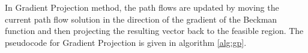 In Gradient Projection method, the path flows are updated by moving
the current path flow solution in the direction of the gradient of the
Beckman function and then projecting the resulting vector back to
the feasible region. The pseudocode for Gradient Projection is
given in algorithm \ref{alg:gp}.

